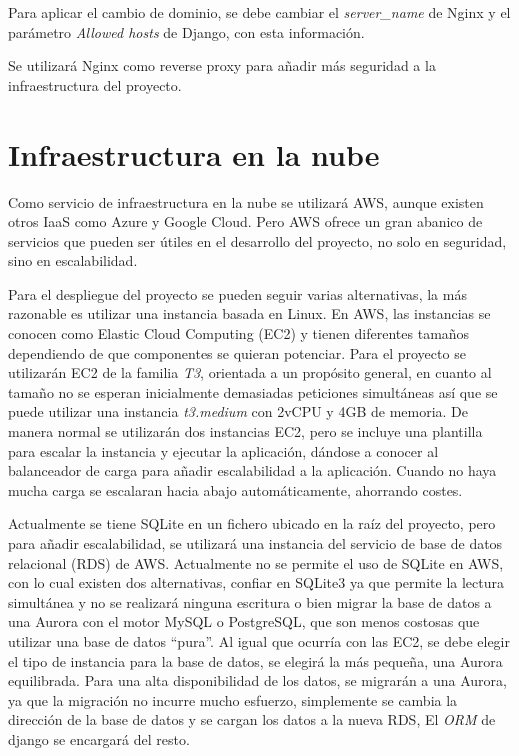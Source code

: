Para aplicar el cambio de dominio, se debe cambiar el \textit{server\_name} de Nginx y el parámetro \textit{Allowed hosts} de Django, con esta información.

Se utilizará Nginx como reverse proxy para añadir más seguridad a la infraestructura del proyecto.

\section{Infraestructura en la nube}
Como servicio de infraestructura en la nube se utilizará \gls{AWS}, aunque existen otros \gls{IaaS} como Azure y Google Cloud. Pero \gls{AWS} ofrece un gran abanico de servicios que pueden ser útiles en el desarrollo del proyecto, no solo en seguridad, sino en escalabilidad. 

Para el despliegue del proyecto se pueden seguir varias alternativas, la más razonable es utilizar una instancia basada en Linux. En \gls{AWS}, las instancias se conocen como Elastic Cloud Computing (\gls{EC2}) y tienen diferentes tamaños dependiendo de que componentes se quieran potenciar. Para el proyecto se utilizarán \gls{EC2} de la familia \textit{T3}, orientada a un propósito general, en cuanto al tamaño no se esperan inicialmente demasiadas peticiones simultáneas así que se puede utilizar una instancia \textit{t3.medium} con 2vCPU y 4GB de memoria. De manera normal se utilizarán dos instancias \gls{EC2}, pero se incluye una plantilla para escalar la instancia y ejecutar la aplicación, dándose a conocer al balanceador de carga para añadir escalabilidad a la aplicación. Cuando no haya mucha carga se escalaran hacia abajo automáticamente, ahorrando costes. 

Actualmente se tiene SQLite en un fichero ubicado en la raíz del proyecto, pero para añadir escalabilidad, se utilizará una instancia del servicio de base de datos relacional (\gls{RDS}) de \gls{AWS}. Actualmente no se permite el uso de SQLite en \gls{AWS}, con lo cual existen dos alternativas, confiar en SQLite3 ya que permite la lectura simultánea y no se realizará ninguna escritura o bien migrar la base de datos a una Aurora con el motor MySQL o PostgreSQL, que son menos costosas que utilizar una base de datos ``pura''. Al igual que ocurría con las \gls{EC2}, se debe elegir el tipo de instancia para la base de datos, se elegirá la más pequeña, una Aurora equilibrada. Para una alta disponibilidad de los datos, se migrarán a una Aurora, ya que la migración no incurre mucho esfuerzo, simplemente se cambia la dirección de la base de datos y se cargan los datos a la nueva \gls{RDS}, El \textit{\gls{ORM}} de \Gls{django} se encargará del resto.


